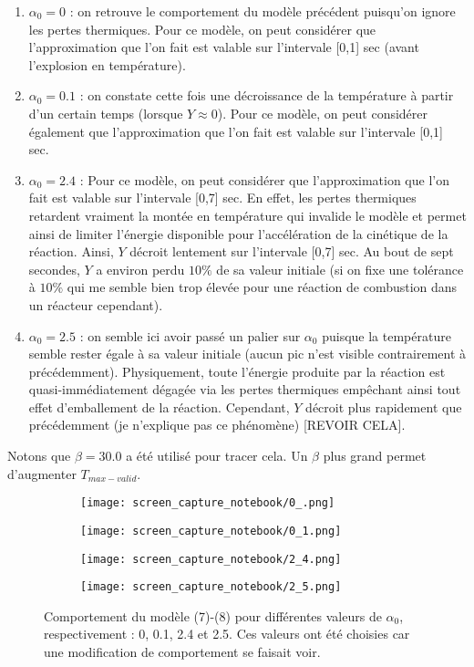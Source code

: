\documentclass[10pt,a4paper,twocolumn]{report}
\begin{document}
	\begin{enumerate}
		\item $\alpha_0 = 0$ : on retrouve le comportement du modèle précédent puisqu'on ignore les pertes thermiques. Pour ce modèle, on peut considérer que l'approximation que l'on fait est valable sur l'intervale [0,1] sec (avant l'explosion en température).
		\item $\alpha_0 = 0.1$ : on constate cette fois une décroissance de la température à partir d'un certain temps (lorsque $Y \approx 0$). Pour ce modèle, on peut considérer également que l'approximation que l'on fait est valable sur l'intervale [0,1] sec.
		\item $\alpha_0 = 2.4$ :  Pour ce modèle, on peut considérer que l'approximation que l'on fait est valable sur l'intervale [0,7] sec. En effet, les pertes thermiques retardent vraiment la montée en température qui invalide le modèle et permet ainsi de limiter l'énergie disponible pour l'accélération de la cinétique de la réaction. Ainsi, $Y$ décroit lentement sur l'intervale [0,7] sec. Au bout de sept secondes, $Y$ a environ perdu $10 \%$ de sa valeur initiale (si on fixe une tolérance à $10 \%$ qui me semble bien trop élevée pour une réaction de combustion dans un réacteur cependant).
		\item $\alpha_0 = 2.5$ : on semble ici avoir passé un palier sur $\alpha_0$ puisque la température semble rester égale à sa valeur initiale (aucun pic n'est visible contrairement à précédemment). Physiquement, toute l'énergie produite par la réaction est quasi-immédiatement dégagée via les pertes thermiques empêchant ainsi tout effet d'emballement de la réaction. Cependant, $Y$ décroit plus rapidement que précédemment (je n'explique pas ce phénomène) [REVOIR CELA].
	\end{enumerate}
	
	Notons que $\beta = 30.0$ a été utilisé pour tracer cela. Un $\beta$ plus grand permet d'augmenter $T_{max-valid}$.
	
	\begin{figure*}
		\centering
		\begin{subfigure}{}
        	\texttt{[image: screen\_capture\_notebook/0\_.png]}
    	\end{subfigure}
		\centering  	
   		\begin{subfigure}{}
        	\texttt{[image: screen\_capture\_notebook/0\_1.png]}
    	\end{subfigure}
    	\centering   		

   		\begin{subfigure}{}
        	\texttt{[image: screen\_capture\_notebook/2\_4.png]}
    	\end{subfigure}
    	\centering   		
   		\begin{subfigure}{}
        	\texttt{[image: screen\_capture\_notebook/2\_5.png]}
    	\end{subfigure}
   	\caption{Comportement du modèle (7)-(8) pour différentes valeurs de $\alpha_0$, respectivement : 0, 0.1, 2.4 et 2.5. Ces valeurs ont été choisies car une modification de comportement se faisait voir.}
    \label{fig:comportement_model_alpha}
	\end{figure*}
	
\end{document}
